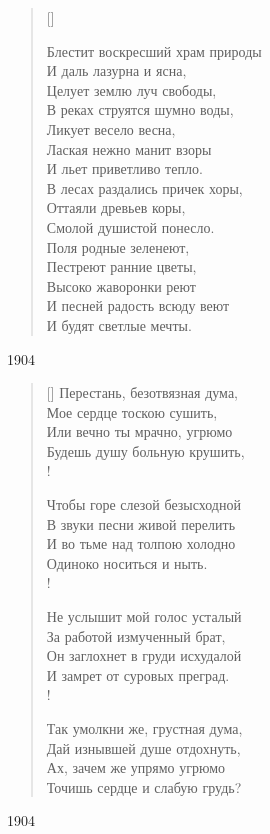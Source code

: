 \settowidth{\versewidth}{Блестит воскресший храм природы}
\begin{verse}[\versewidth]
\begin{patverse*}
Блестит воскресший храм природы\\
И даль лазурна и ясна,\\
Целует землю луч свободы,\\
В реках струятся шумно воды,\\
Ликует весело весна,\\
Лаская нежно манит взоры\\
И льет приветливо тепло.\\
В лесах раздались причек хоры,\\
Оттаяли древьев коры,\\
Смолой душистой понесло.\\
Поля родные зеленеют,\\
Пестреют ранние цветы,\\
Высоко жаворонки реют\\
И песней радость всюду веют\\
И будят светлые мечты.
\end{patverse*}
\end{verse}
1904

\settowidth{\versewidth}{Перестань безотвязная дума}
\begin{verse}[\versewidth]
Перестань, безотвязная дума,\\
Мое сердце тоскою сушить,\\
Или вечно ты мрачно, угрюмо\\
Будешь душу больную крушить,\\!

Чтобы горе слезой безысходной\\
В звуки песни живой перелить\\
И во тьме над толпою холодно\\
Одиноко носиться и ныть.\\!

Не услышит мой голос усталый\\
За работой измученный брат,\\
Он заглохнет в груди исхудалой\\
И замрет от суровых преград.\\!

Так умолкни же, грустная дума,\\
Дай изнывшей душе отдохнуть,\\
Ах, зачем же упрямо угрюмо\\
Точишь сердце и слабую грудь?
\end{verse}
1904


